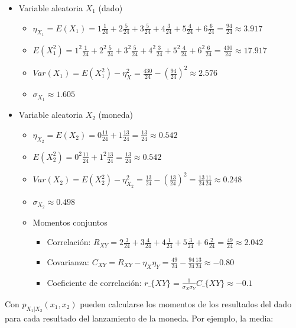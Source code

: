 \documentclass[11pt]{article}
\providecommand{\tightlist}{%
      \setlength{\itemsep}{0pt}\setlength{\parskip}{0pt}}
\begin{document}
    \begin{itemize}
\tightlist
\item
  Variable aleatoria \(X_1\) (dado)

  \begin{itemize}
  \tightlist
  \item
    \(\eta_{X_1}=E(X_1)=1\frac{1}{24}+2\frac{5}{24}+3\frac{5}{24}+4\frac{3}{24}+5\frac{4}{24}+6\frac{6}{24}=\frac{94}{24}\approx3.917\)
  \item
    \(E(X_1^2)=1^2\frac{1}{24}+2^2\frac{5}{24}+3^2\frac{5}{24}+4^2\frac{3}{24}+5^2\frac{4}{24}+6^2\frac{6}{24}=\frac{430}{24}\approx 17.917\)
  \item
    \(Var(X_1)=E(X_1^2) -\eta_X^2= \frac{430}{24}-(\frac{94}{24})^2 \approx 2.576\)
  \item
    \(\sigma_{X_1} \approx 1.605\)
  \end{itemize}
\item
  Variable aleatoria \(X_2\) (moneda)

  \begin{itemize}
  \tightlist
  \item
    \(\eta_{X_2}=E(X_2)= 0\frac{11}{24}+1\frac{13}{24}=\frac{13}{24}\approx 0.542\)
  \item
    \(E(X_2^2)= 0^2\frac{11}{24}+1^2\frac{13}{24}=\frac{13}{24}\approx 0.542\)
  \item
    \(Var(X_2)=E(X_2^2) -\eta_{X_2}^2= \frac{13}{24}-(\frac{13}{24})^2=\frac{13}{24}\frac{11}{24} \approx 0.248\)
  \item
    \(\sigma_{X_2} \approx 0.498\)
  \item
    Momentos conjuntos

    \begin{itemize}
    \tightlist
    \item
      Correlación:
      \(R_{XY} = 2\frac{3}{24}+3\frac{4}{24}+4\frac{1}{24}+5\frac{3}{24}+6\frac{2}{24}=\frac{49}{24} \approx 2.042\)
    \item
      Covarianza:
      \(C_{XY}=R_{XY}-\eta_X\eta_Y= \frac{49}{24}-\frac{94}{24}\frac{13}{24}\approx -0.80\)
    \item
      Coeficiente de correlación: \(r\_\{XY\} =
      \frac{1}{\sigma_X\sigma_Y}C\_\{XY\} \approx -0.1 \)
    \end{itemize}
  \end{itemize}
\end{itemize}

    Con \(p_{X_1 | X_2}(x_1, x_2)\) pueden calcularse los momentos de los
resultados del dado para cada resultado del lanzamiento de la moneda.
Por ejemplo, la media:
\end{document}
